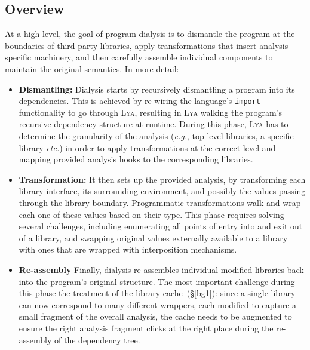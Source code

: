 \documentclass[letterpaper,twocolumn,10pt]{article}
\def\eg{{\em e.g.}, }
\def\etc{{\em etc.}\xspace}
\newcommand{\ttt}[1]{\texttt{#1}}
\newcommand{\sx}[1]{(\S\ref{#1})}
\newcommand{\sys}{{\scshape Lya}\xspace}
\begin{document}
\subsection{Overview}
\label{overview}

At a high level, the goal of program dialysis is to dismantle the program at the boundaries of third-party libraries, apply transformations that insert analysis-specific machinery, and then carefully assemble individual components to maintain the original semantics.
 In more detail:

\begin{itemize}
  
  \item \textbf{Dismantling:}
Dialysis starts by recursively dismantling a program into its dependencies. %
This is achieved by re-wiring the language's \ttt{import} functionality to go through \sys, resulting in \sys walking the program's recursive dependency structure at runtime.
During this phase, \sys has to determine the granularity of the analysis (\eg top-level libraries, a specific library \etc) in order to apply transformations at the correct level and mapping provided analysis hooks to the corresponding libraries.

  \item \textbf{Transformation:}
It then sets up the provided analysis, by transforming each library interface, its surrounding environment, and possibly the values passing through the library boundary.
Programmatic transformations walk and wrap each one of these values based on their type.
This phase requires solving several challenges, including enumerating all points of entry into and exit out of a library, 
and swapping original values externally available to a library with ones that are wrapped with interposition mechanisms.

  \item \textbf{Re-assembly}
Finally, dialysis re-assembles individual modified libraries back into the program's original structure.
The most important challenge during this phase the treatment of the library cache~\sx{bg1}:
  since a single library can now correspond to many different wrappers, each modified to capture a small fragment of the overall analysis, the cache needs to be augmented to ensure the right analysis fragment clicks at the right place during the re-assembly of the dependency tree.

\end{itemize}
\end{document}
